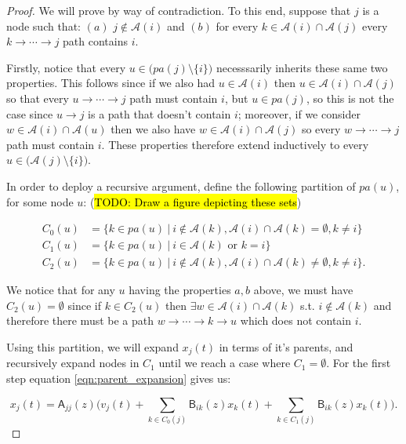 \documentclass[12pt]{article}
\def\B{\mathsf{B}}  %
\def\A{\mathsf{A}}  %
\newcommand{\pa}[1]{pa(#1)}  %
\newcommand{\anc}[1]{\mathcal{A}(#1)}  %
\newcommand{\gcgpath}[2]{#1 \rightarrow \cdots \rightarrow #2}  %
\begin{document}
\begin{proof}
  We will prove by way of contradiction.  To this end, suppose that
  $j$ is a node such that: $(a)$ $j \not \in \anc{i}$ and $(b)$ for
  every $k \in \anc{i} \cap \anc{j}$ every
  $k \rightarrow \cdots \rightarrow j$ path contains $i$.

  Firstly, notice that every $u \in \big(\pa{j} \setminus \{i\}\big)$
  necesssarily inherits these same two properties.  This follows since
  if we also had $u \in \anc{i}$ then $u \in \anc{i} \cap \anc{j}$ so that every
  $u \rightarrow \cdots \rightarrow j$ path must contain $i$, but
  $u \in \pa{j}$, so this is not the case since $u \rightarrow j$ is a
  path that doesn't contain $i$; moreover, if we consider
  $w \in \anc{i} \cap \anc{u}$ then we also have
  $w \in \anc{i} \cap \anc{j}$ so every
  $w \rightarrow \cdots \rightarrow j$ path must contain $i$.  These
  properties therefore extend inductively to every
  $u \in \big(\anc{j} \setminus \{i\}\big)$.

  In order to deploy a recursive argument, define the following
  partition of $\pa{u}$, for some node $u$: (\hl{TODO: Draw a figure depicting these sets})

  \begin{align*}
    C_0(u) &= \{k \in \pa{u}\ |\ i \not\in \anc{k}, \anc{i} \cap \anc{k} = \emptyset, k \ne i\}\\
    C_1(u) &= \{k \in \pa{u}\ |\ i \in \anc{k} \text{ or } k = i\}\\
    C_2(u) &= \{k \in \pa{u}\ |\ i \not\in \anc{k}, \anc{i} \cap \anc{k} \ne \emptyset, k \ne i\}.
  \end{align*}

  We notice that for any $u$ having the properties $a, b$ above, we
  must have $C_2(u) = \emptyset$ since if $k \in C_2(u)$ then
  $\exists w \in \anc{i} \cap \anc{k}$ s.t. $i \not \in \anc{k}$ and
  therefore there must be a path $\gcgpath{w}{k} \rightarrow u$ which
  does not contain $i$.

  Using this partition, we will expand $x_j(t)$ in terms of it's
  parents, and recursively expand nodes in $C_1$ until we reach a case
  where $C_1 = \emptyset$.  For the first step equation
  \eqref{eqn:parent_expansion} gives us:

  \begin{equation}
    \label{eqn:xj_partition_expansion}
    x_j(t) = \A_{jj}(z)\Big(v_j(t) + \sum_{k \in C_0(j)}\B_{ik}(z)x_k(t) + \sum_{k \in C_1(j)}\B_{ik}(z)x_k(t)\Big).
  \end{equation}


\end{proof}
\end{document}
